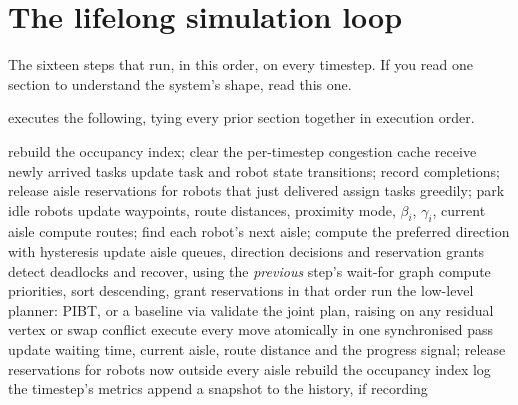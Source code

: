 \section{The lifelong simulation loop}
\label{sec:loop}

\begin{lede}
The sixteen steps that run, in this order, on every timestep. If you read one
section to understand the system's shape, read this one.
\end{lede}

 executes the following, tying every prior section
together in execution order.

\begin{algorithm}[H]
\caption{ --- one timestep}
\begin{algorithmic}[1]
\State rebuild the occupancy index; clear the per-timestep congestion cache
\State receive newly arrived tasks 
\State update task and robot state transitions; record completions; release
  aisle reservations for robots that just delivered
\State assign tasks greedily; park idle robots 
\State update waypoints, route distances, proximity mode, $\beta_i$, $\gamma_i$,
  current aisle 
\State compute routes; find each robot's next aisle; compute the preferred
  direction with hysteresis 
\State update aisle queues, direction decisions and reservation grants
\State detect deadlocks and recover, using the \emph{previous} step's wait-for
  graph 
\State compute priorities, sort descending, grant reservations in that order
\State run the low-level planner: PIBT, or a baseline via
   
\State validate the joint plan, raising on any residual vertex or swap conflict
\State execute every move atomically in one synchronised pass
\State update waiting time, current aisle, route distance and the progress
  signal; release reservations for robots now outside every aisle
\State rebuild the occupancy index 
\State log the timestep's metrics
\State append a snapshot to the history, if recording
\end{algorithmic}
\end{algorithm}

